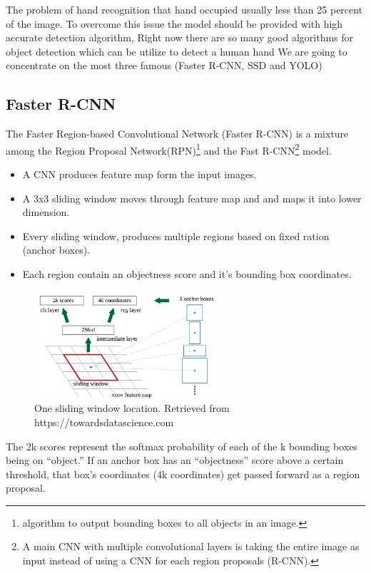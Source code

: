\documentclass[12pt]{report}
\begin{document}
The problem of hand recognition that hand occupied usually less than 25 percent of the image.
To overcome this issue the model should be provided with high accurate detection algorithm,
Right now there are so many good algorithms for object detection which can be utilize to 
detect a human hand We are going to concentrate on the most three famous (Faster R-CNN, SSD and YOLO)

\subsection{Faster R-CNN}

The Faster Region-based Convolutional Network (Faster R-CNN) is a  mixture among  
the Region Proposal Network(RPN)\footnote{algorithm to output bounding boxes to all objects in an image.} 
and the Fast R-CNN\footnote{A main CNN with multiple convolutional layers is taking the entire image as input instead of using a CNN for each region proposals (R-CNN).} model.
\begin{itemize}
    \item A CNN produces feature map form the input images.
    \item A 3x3 sliding window moves through feature map and and maps it into lower dimension.
    \item Every sliding window, produces multiple regions based on fixed ration (anchor boxes).
    \item Each region contain an objectness score and it's bounding box coordinates.
\end{itemize}
\begin{figure}[h]
    \centering
    \includegraphics[width=0.6\textwidth]{./images/cfm.png}
    \caption{One sliding window location. Retrieved from https://towardsdatascience.com}
    \label{fig:frcnn}
\end{figure} 
The 2k scores represent the softmax probability of each of the k bounding boxes being on “object.”
If an anchor box has an “objectness” score above a certain threshold, that box’s coordinates (4k coordinates) get passed forward as a region proposal.
\end{document}
